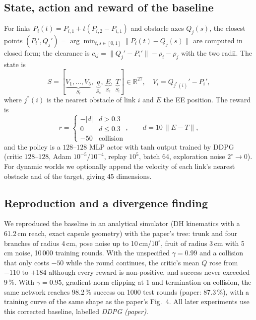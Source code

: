 \documentclass[conference]{IEEEtran}
\begin{document}
\subsection{State, action and reward of the baseline}
For links $P_i(t)=P_{i,1}+t(P_{i,2}-P_{i,1})$ and obstacle axes $Q_j(s)$, the closest points $(P_i',Q_j')=\arg\min_{t,s\in[0,1]}\|P_i(t)-Q_j(s)\|$ are computed in closed form; the clearance is $c_{ij}=\|Q_j'-P_i'\|-\rho_i-\rho_j$ with the two radii. The state is
\begin{equation}
S=[\underbrace{V_1,\dots,V_5}_{S_l},\ \underbrace{q}_{S_a},\ \underbrace{E}_{S_e},\ \underbrace{T}_{S_t}]\in\mathbb{R}^{27},\quad V_i=Q_{j^*(i)}'-P_i',
\label{eq:state}
\end{equation}
where $j^*(i)$ is the nearest obstacle of link $i$ and $E$ the EE position. The reward is
\begin{equation}
r=\begin{cases}-|d| & d>0.3\\ 0 & d\le 0.3\\ -50 & \text{collision}\end{cases},\qquad d=10\,\|E-T\|,
\label{eq:reward}
\end{equation}
and the policy is a $128$--$128$ MLP actor with tanh output trained by DDPG (critic $128$--$128$, Adam $10^{-5}/10^{-4}$, replay $10^5$, batch 64, exploration noise $2^\circ\!\to\!0$). For dynamic worlds we optionally append the velocity of each link's nearest obstacle and of the target, giving 45 dimensions.

\subsection{Reproduction and a divergence finding}
We reproduced the baseline in an analytical simulator (DH kinematics with a 61.2\,cm reach, exact capsule geometry) with the paper's tree: trunk and four branches of radius 4\,cm, pose noise up to 10\,cm/$10^\circ$, fruit of radius 3\,cm with 5\,cm noise, 10\,000 training rounds. With the unspecified $\gamma=0.99$ and a collision that only costs $-50$ while the round continues, the critic's mean $Q$ rose from $-110$ to $+184$ although every reward is non-positive, and success never exceeded 9\,\%. With $\gamma=0.95$, gradient-norm clipping at 1 and termination on collision, the same network reaches 98.2\,\% success on 1000 test rounds (paper: 87.3\,\%), with a training curve of the same shape as the paper's Fig.~4. All later experiments use this corrected baseline, labelled \emph{DDPG (paper)}.
\end{document}
